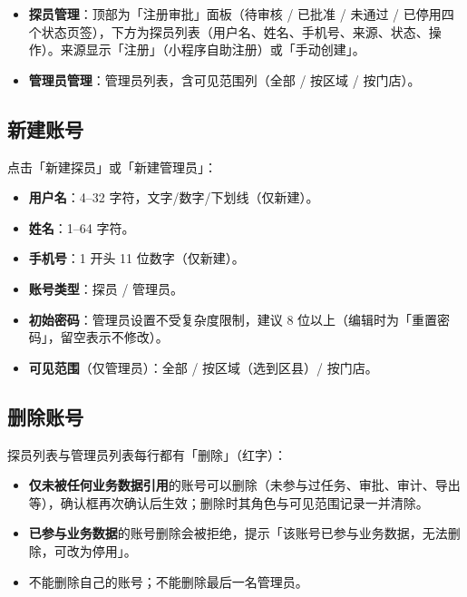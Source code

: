 \documentclass[12pt,a4paper,fontset=none]{ctexart}
\begin{document}
\begin{itemize}
\item \textbf{探员管理}：顶部为「注册审批」面板（待审核 / 已批准 / 未通过 / 已停用四个状态页签），下方为探员列表（用户名、姓名、手机号、来源、状态、操作）。来源显示「注册」（小程序自助注册）或「手动创建」。
\item \textbf{管理员管理}：管理员列表，含可见范围列（全部 / 按区域 / 按门店）。
\end{itemize}

\subsection{新建账号}
点击「新建探员」或「新建管理员」：

\begin{itemize}
\item \textbf{用户名}：4–32 字符，文字/数字/下划线（仅新建）。
\item \textbf{姓名}：1–64 字符。
\item \textbf{手机号}：1 开头 11 位数字（仅新建）。
\item \textbf{账号类型}：探员 / 管理员。
\item \textbf{初始密码}：管理员设置不受复杂度限制，建议 8 位以上（编辑时为「重置密码」，留空表示不修改）。
\item \textbf{可见范围}（仅管理员）：全部 / 按区域（选到区县）/ 按门店。
\end{itemize}



\subsection{删除账号}
探员列表与管理员列表每行都有「删除」（红字）：

\begin{itemize}
\item \textbf{仅未被任何业务数据引用}的账号可以删除（未参与过任务、审批、审计、导出等），确认框再次确认后生效；删除时其角色与可见范围记录一并清除。
\item \textbf{已参与业务数据}的账号删除会被拒绝，提示「该账号已参与业务数据，无法删除，可改为停用」。
\item 不能删除自己的账号；不能删除最后一名管理员。
\end{itemize}
\end{document}
